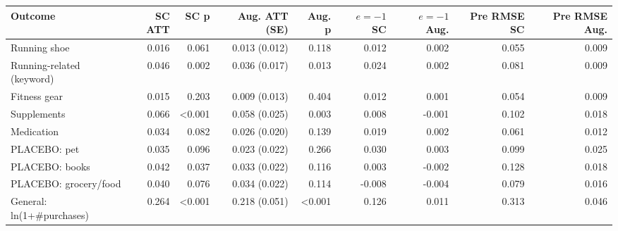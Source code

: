\begin{tabular}{lrrrrrrrr}
\toprule
Outcome & SC ATT & SC p & Aug. ATT (SE) & Aug. p & $e{=}{-}1$ SC & $e{=}{-}1$ Aug. & Pre RMSE SC & Pre RMSE Aug. \\
\midrule
Running shoe & 0.016 & 0.061 & 0.013 (0.012) & 0.118 & 0.012 & 0.002 & 0.055 & 0.009 \\
Running-related (keyword) & 0.046 & 0.002 & 0.036 (0.017) & 0.013 & 0.024 & 0.002 & 0.081 & 0.009 \\
Fitness gear & 0.015 & 0.203 & 0.009 (0.013) & 0.404 & 0.012 & 0.001 & 0.054 & 0.009 \\
Supplements & 0.066 & <0.001 & 0.058 (0.025) & 0.003 & 0.008 & -0.001 & 0.102 & 0.018 \\
Medication & 0.034 & 0.082 & 0.026 (0.020) & 0.139 & 0.019 & 0.002 & 0.061 & 0.012 \\
PLACEBO: pet & 0.035 & 0.096 & 0.023 (0.022) & 0.266 & 0.030 & 0.003 & 0.099 & 0.025 \\
PLACEBO: books & 0.042 & 0.037 & 0.033 (0.022) & 0.116 & 0.003 & -0.002 & 0.128 & 0.018 \\
PLACEBO: grocery/food & 0.040 & 0.076 & 0.034 (0.022) & 0.114 & -0.008 & -0.004 & 0.079 & 0.016 \\
General: ln(1+\#purchases) & 0.264 & <0.001 & 0.218 (0.051) & <0.001 & 0.126 & 0.011 & 0.313 & 0.046 \\
\bottomrule
\end{tabular}
